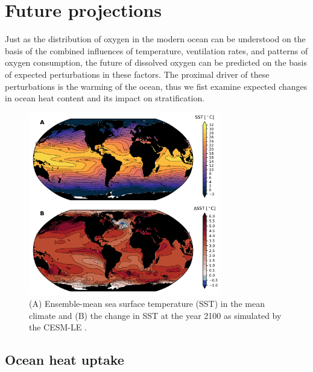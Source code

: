\documentclass[draft,linenumbers]{report_chapter}
\begin{document}
\section{Future projections}

Just as the distribution of oxygen in the modern ocean can be understood on the basis of the combined influences of temperature, ventilation rates, and patterns of oxygen consumption, the future of dissolved oxygen can be predicted on the basis of expected perturbations in these factors.
The proximal driver of these perturbations is the warming of the ocean, thus we fist examine expected changes in ocean heat content and its impact on stratification.

\begin{figure}[tb]
\centering
\includegraphics[width=0.75\textwidth]{cesm-sst.pdf}
\caption{(A) Ensemble-mean sea surface temperature (SST) in the mean climate and (B) the change in SST at the year 2100 as simulated by the CESM-LE \protect\citep{Kay-Deser-etal-2015}.}
\label{fig:cesm-temp-change}
\end{figure}

\subsection{Ocean heat uptake}\label{loc:heat-uptake}
\end{document}
